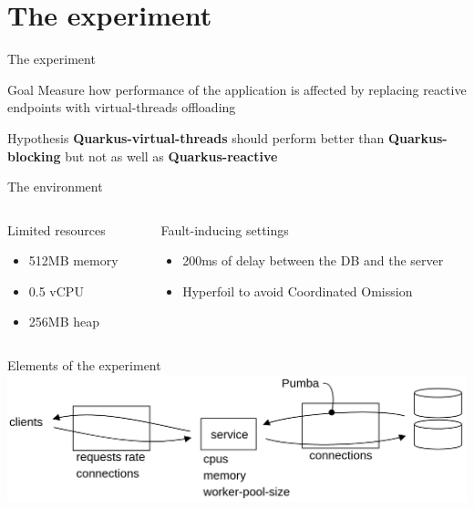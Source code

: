 \documentclass{beamer}
\begin{document}
\section{The experiment}
\begin{frame}{The experiment}
    \begin{block}{Goal}
        Measure how performance of the application is affected by replacing reactive endpoints with virtual-threads offloading
    \end{block}
    \begin{block}{Hypothesis}
        \textbf{Quarkus-virtual-threads} should perform better than \textbf{Quarkus-blocking} but not as well as \textbf{Quarkus-reactive}
    \end{block}
\end{frame}
\begin{frame}{The environment}
    \begin{columns}
        \begin{column}{0.5\textwidth}
            \begin{center}
                \Large{Limited resources}
                \vspace{0.76cm}
                \normalsize
                \begin{itemize}    
                    \item 512MB memory
                    \item 0.5 vCPU
                    \item 256MB heap
                \end{itemize}
            \end{center}
        \end{column}
        \begin{column}{0.48\textwidth}
            \begin{center}
                \Large{Fault-inducing settings}
                \vspace{0.5cm}
                \normalsize
                \begin{itemize}    
                    \item 200ms of delay between the DB and the server
                    \item Hyperfoil to avoid Coordinated Omission
                \end{itemize}
            \end{center}
        \end{column}
    \end{columns}
\end{frame}
\begin{frame}{Elements of the experiment}
    \includegraphics[width=\textwidth]{assets/exp.png}
\end{frame}
\normalsize
\end{document}
